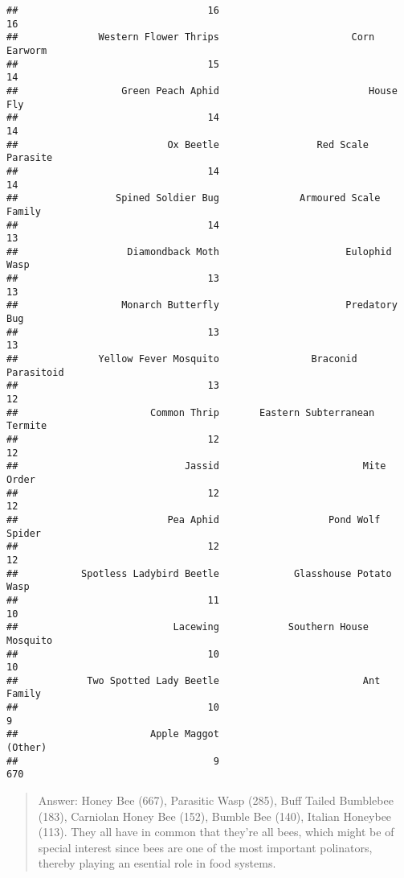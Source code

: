 \documentclass[
]{article}
\begin{document}
\begin{verbatim}
##                                 16                                 16 
##              Western Flower Thrips                       Corn Earworm 
##                                 15                                 14 
##                  Green Peach Aphid                          House Fly 
##                                 14                                 14 
##                          Ox Beetle                 Red Scale Parasite 
##                                 14                                 14 
##                 Spined Soldier Bug              Armoured Scale Family 
##                                 14                                 13 
##                   Diamondback Moth                      Eulophid Wasp 
##                                 13                                 13 
##                  Monarch Butterfly                      Predatory Bug 
##                                 13                                 13 
##              Yellow Fever Mosquito                Braconid Parasitoid 
##                                 13                                 12 
##                       Common Thrip       Eastern Subterranean Termite 
##                                 12                                 12 
##                             Jassid                         Mite Order 
##                                 12                                 12 
##                          Pea Aphid                   Pond Wolf Spider 
##                                 12                                 12 
##           Spotless Ladybird Beetle             Glasshouse Potato Wasp 
##                                 11                                 10 
##                           Lacewing            Southern House Mosquito 
##                                 10                                 10 
##            Two Spotted Lady Beetle                         Ant Family 
##                                 10                                  9 
##                       Apple Maggot                            (Other) 
##                                  9                                670
\end{verbatim}

\begin{quote}
Answer: Honey Bee (667), Parasitic Wasp (285), Buff Tailed Bumblebee
(183), Carniolan Honey Bee (152), Bumble Bee (140), Italian Honeybee
(113). They all have in common that they're all bees, which might be of
special interest since bees are one of the most important polinators,
thereby playing an esential role in food systems.
\end{quote}
\end{document}
